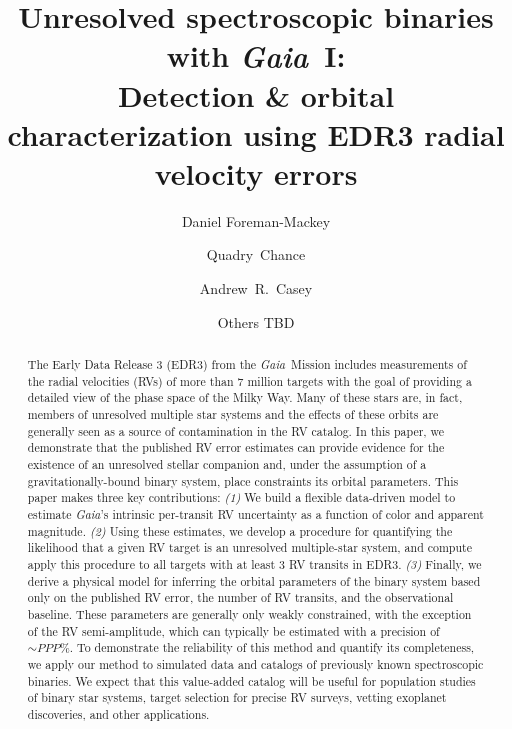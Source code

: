 \documentclass[modern, letterpaper]{aastex63}
\newcommand{\project}[1]{\textsl{#1}}
\newcommand{\Gaia}{\project{Gaia}}
\begin{document}
\title{Unresolved spectroscopic binaries with \Gaia\ I: \\
	Detection \& orbital characterization using EDR3 radial velocity errors}


\author[0000-0002-9328-5652]{Daniel Foreman-Mackey}

\author{Quadry~Chance}

\author{Andrew~R.~Casey}

\author{Others TBD}
\noaffiliation{}

\begin{abstract}
	The Early Data Release 3 (EDR3) from the \Gaia\ Mission includes measurements of the radial velocities (RVs) of more than 7 million targets with the goal of providing a detailed view of the phase space of the Milky Way.
	Many of these stars are, in fact, members of unresolved multiple star systems and the effects of these orbits are generally seen as a source of contamination in the RV catalog.
	In this paper, we demonstrate that the published RV error estimates can provide evidence for the existence of an unresolved stellar companion and, under the assumption of a gravitationally-bound binary system, place constraints its orbital parameters.
	This paper makes three key contributions:
	\emph{(1)} We build a flexible data-driven model to estimate \Gaia's intrinsic per-transit RV uncertainty as a function of color and apparent magnitude.
	\emph{(2)} Using these estimates, we develop a procedure for quantifying the likelihood that a given RV target is an unresolved multiple-star system, and compute apply this procedure to all targets with at least 3 RV transits in EDR3.
	\emph{(3)} Finally, we derive a physical model for inferring the orbital parameters of the binary system based only on the published RV error, the number of RV transits, and the observational baseline.
	These parameters are generally only weakly constrained, with the exception of the RV semi-amplitude, which can typically be estimated with a precision of $\sim PPP\%$.
	To demonstrate the reliability of this method and quantify its completeness, we apply our method to simulated data and catalogs of previously known spectroscopic binaries.
	We expect that this value-added catalog will be useful for population studies of binary star systems, target selection for precise RV surveys, vetting exoplanet discoveries, and other applications.
\end{abstract}
\end{document}
